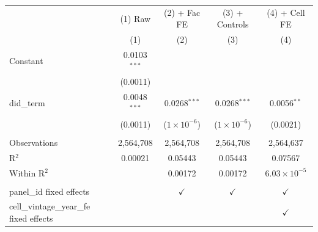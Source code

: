 
\begingroup
\centering
\begin{tabular}{lcccc}
   \toprule
                                            & (1) Raw        & (2) + Fac FE         & (3) + Controls       & (4) + Cell FE \\   
                                            & (1)            & (2)                  & (3)                  & (4)\\  
   \midrule 
   Constant                                 & 0.0103$^{***}$ &                      &                      &   \\   
                                            & (0.0011)       &                      &                      &   \\   
   did\_term                                & 0.0048$^{***}$ & 0.0268$^{***}$       & 0.0268$^{***}$       & 0.0056$^{**}$\\   
                                            & (0.0011)       & ($1\times 10^{-6}$)  & ($1\times 10^{-6}$)  & (0.0021)\\   
    \\
   Observations                             & 2,564,708      & 2,564,708            & 2,564,708            & 2,564,637\\  
   R$^2$                                    & 0.00021        & 0.05443              & 0.05443              & 0.07567\\  
   Within R$^2$                             &                & 0.00172              & 0.00172              & $6.03\times 10^{-5}$\\   
    \\
   panel\_id fixed effects                  &                & $\checkmark$         & $\checkmark$         & $\checkmark$\\   
   cell\_vintage\_year\_fe fixed effects    &                &                      &                      & $\checkmark$\\   
   \bottomrule
\end{tabular}
\par\endgroup


